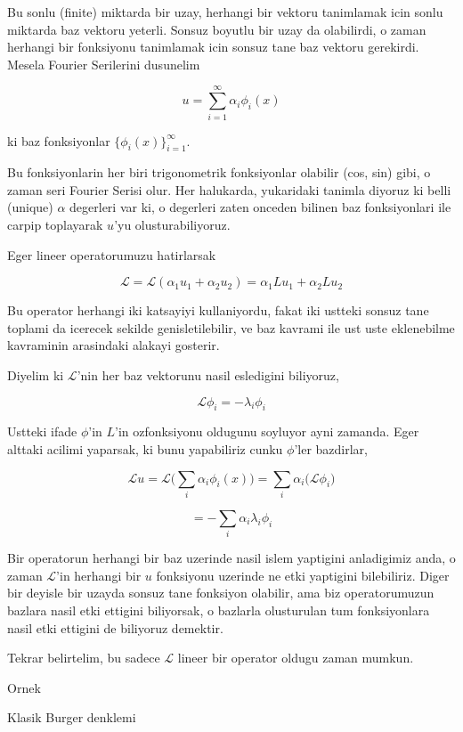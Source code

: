 \documentclass[12pt,fleqn]{article}
\begin{document}
Bu sonlu (finite) miktarda bir uzay, herhangi bir vektoru tanimlamak icin
sonlu miktarda baz vektoru yeterli. Sonsuz boyutlu bir uzay da olabilirdi,
o zaman herhangi bir fonksiyonu tanimlamak icin sonsuz tane baz vektoru
gerekirdi. Mesela Fourier Serilerini dusunelim

\[ u = \sum_{i=1}^{\infty} \alpha_i \phi_i(x) \]

ki baz fonksiyonlar $\bigg\{ \phi_i(x)  \bigg\}_{i=1}^\infty$.

Bu fonksiyonlarin her biri trigonometrik fonksiyonlar olabilir (cos, sin)
gibi, o zaman seri Fourier Serisi olur. Her halukarda, yukaridaki tanimla
diyoruz ki belli (unique) $\alpha$ degerleri var ki, o degerleri zaten
onceden bilinen baz fonksiyonlari ile carpip toplayarak $u$'yu
olusturabiliyoruz.

Eger lineer operatorumuzu hatirlarsak

\[ \mathcal{L} = \mathcal{L}(\alpha_1 u_1 + \alpha_2 u_2) = 
\alpha_1 Lu_1 + \alpha_2 Lu_2 \]

Bu operator herhangi iki katsayiyi kullaniyordu, fakat iki ustteki sonsuz
tane toplami da icerecek sekilde genisletilebilir, ve baz kavrami ile ust
uste eklenebilme kavraminin arasindaki alakayi gosterir. 

Diyelim ki $\mathcal{L}$'nin her baz vektorunu nasil esledigini biliyoruz, 

\[ \mathcal{L} \phi_i = -\lambda_i \phi_i \]

Ustteki ifade $\phi$'in $L$'in ozfonksiyonu oldugunu soyluyor ayni
zamanda. Eger alttaki acilimi yaparsak, ki bunu yapabiliriz cunku
$\phi$'ler bazdirlar, 

\[ \mathcal{L}u = \mathcal{L} \bigg( \sum_i \alpha_i \phi_i(x) \bigg) =
\sum_i \alpha_i \bigg( \mathcal{L} \phi_i \bigg)
 \]

\[ = -\sum_i \alpha_i \lambda_i \phi_i  \]

Bir operatorun herhangi bir baz uzerinde nasil islem yaptigini anladigimiz
anda, o zaman $\mathcal{L}$'in herhangi bir $u$ fonksiyonu uzerinde ne etki yaptigini
bilebiliriz. Diger bir deyisle bir uzayda sonsuz tane fonksiyon olabilir,
ama biz operatorumuzun bazlara nasil etki ettigini biliyorsak, o bazlarla
olusturulan tum fonksiyonlara nasil etki ettigini de biliyoruz demektir. 

Tekrar belirtelim, bu sadece $\mathcal{L}$ lineer bir operator oldugu zaman mumkun. 

Ornek

Klasik Burger denklemi
\end{document}
